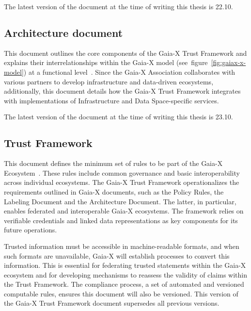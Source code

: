 The latest version of the document at the time of writing this thesis is 22.10.

\subsection{Architecture document}\label{subsec:architecture-document}

This document outlines the core components of the Gaia-X Trust Framework and explains their interrelationships within the Gaia-X model (see~figure~\ref{fig:gaiax-x-model}) at a functional level~\cite{gaiax_architecture_document}.
Since the Gaia-X Association collaborates with various partners to develop infrastructure and data-driven ecosystems, additionally, this document details how the Gaia-X Trust Framework integrates with implementations of Infrastructure and Data Space-specific services.

The latest version of the document at the time of writing this thesis is 23.10.

\subsection{Trust Framework}\label{subsec:trust-framework}

This document defines the minimum set of rules to be part of the Gaia-X Ecosystem~\cite{gaiax_trust_framework}.
These rules include common governance and basic interoperability across individual ecosystems.
The Gaia-X Trust Framework operationalizes the requirements outlined in Gaia-X documents, such as the Policy Rules, the Labeling Document and the Architecture Document. %
The latter, in particular, enables federated and interoperable Gaia-X ecosystems.
The framework relies on verifiable credentials and linked data representations as key components for its future operations.

Trusted information must be accessible in machine-readable formats, and when such formats are unavailable, Gaia-X will establish processes to convert this information.
This is essential for federating trusted statements within the Gaia-X ecosystem and for developing mechanisms to reassess the validity of claims within the Trust Framework.
The compliance process, a set of automated and versioned computable rules, ensures this document will also be versioned.
This version of the Gaia-X Trust Framework document supersedes all previous versions.

